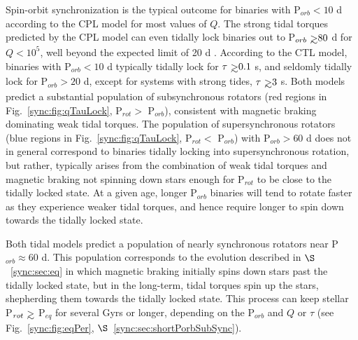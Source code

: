 Spin-orbit synchronization is the typical outcome for binaries with P$_{orb} < 10$ d according to the CPL model for most values of $Q$. The strong tidal torques predicted by the CPL model can even tidally lock binaries out to P$_{orb} \gsim 80 $ d for $Q < 10^5$, well beyond the expected limit of 20 d \citep{Meibom2006}.  According to the CTL model, binaries with P$_{orb} < 10$ d typically tidally lock for $\tau \gsim 0.1$ s, and seldomly tidally lock for P$_{orb} > 20$ d, except for systems with strong tides, $\tau \gsim 3$ s.  Both models predict a substantial population of subsynchronous rotators (red regions in Fig.~\ref{sync:fig:qTauLock}, P$_{rot} >$ P$_{orb}$), consistent with magnetic braking dominating weak tidal torques.  The population of supersynchronous rotators (blue regions in Fig.~\ref{sync:fig:qTauLock}, P$_{rot} <$ P$_{orb}$) with P$_{orb} > 60$ d does not in general correspond to binaries tidally locking into supersynchronous rotation, but rather, typically arises from the combination of weak tidal torques and magnetic braking not spinning down stars enough for P$_{rot}$ to be close to the tidally locked state. At a given age, longer P$_{orb}$ binaries will tend to rotate faster as they experience weaker tidal torques, and hence require longer to spin down towards the tidally locked state.

Both tidal models predict a population of nearly synchronous rotators near P$_{orb} \approx 60$ d.  This population corresponds to the evolution described in $\S$~\ref{sync:sec:eq} in which magnetic braking initially spins down stars past the tidally locked state, but in the long-term, tidal torques spin up the stars, shepherding them towards the tidally locked state.  This process can keep stellar P$_{rot} \gsim$ P$_{eq}$ for several Gyrs or longer, depending on the P$_{orb}$ and $Q$ or $\tau$ (see Fig.~\ref{sync:fig:eqPer}, $\S$~\ref{sync:sec:shortPorbSubSync}). 

